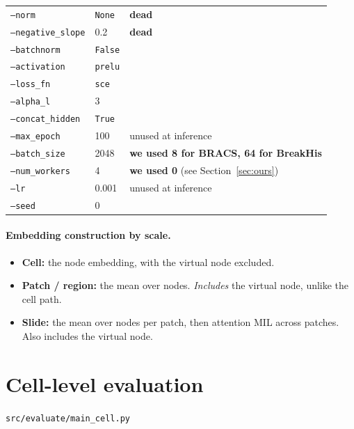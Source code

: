 \documentclass[10pt,a4paper]{article}
\newcommand{\dead}{\textcolor{eosin}{\textbf{dead}}}
\begin{document}
\begin{longtable}{@{}p{4.0cm}p{2.8cm}p{8.8cm}@{}}
\texttt{--norm} & \texttt{None} & \dead \\
\texttt{--negative\_slope} & 0.2 & \dead \\
\texttt{--batchnorm} & \texttt{False} & \\
\texttt{--activation} & \texttt{prelu} & \\
\texttt{--loss\_fn} & \texttt{sce} & \\
\texttt{--alpha\_l} & 3 & \\
\texttt{--concat\_hidden} & \texttt{True} & \\
\texttt{--max\_epoch} & 100 & unused at inference \\
\texttt{--batch\_size} & 2048 & \textbf{we used 8 for BRACS, 64 for BreakHis} \\
\texttt{--num\_workers} & 4 & \textbf{we used 0} (see Section~\ref{sec:ours}) \\
\texttt{--lr} & 0.001 & unused at inference \\
\texttt{--seed} & 0 & \\
\bottomrule
\end{longtable}

\paragraph{Embedding construction by scale.}
\begin{itemize}\itemsep2pt
  \item \textbf{Cell:} the node embedding, with the virtual node excluded.
  \item \textbf{Patch / region:} the mean over nodes. \emph{Includes} the virtual
        node, unlike the cell path.
  \item \textbf{Slide:} the mean over nodes per patch, then attention MIL across
        patches. Also includes the virtual node.
\end{itemize}

\newpage
\section{Cell-level evaluation}
\noindent\texttt{src/evaluate/main\_cell.py}
\end{document}
